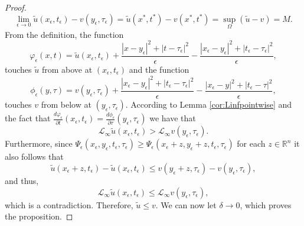 \documentclass[11pt]{article}
\providecommand{\Linf}{\mathcal{L}_{\infty}}
\providecommand{\Rn}{\mathbb{R}^n}
\numberwithin{equation}{section}
\theoremstyle{definition}
\begin{document}
\begin{proof}
    \begin{equation*}
        \lim_{\epsilon \to 0} \tilde{u}(x_{\epsilon}, t_{\epsilon})-v(y_{\epsilon}, \tau_{\epsilon}) =\tilde{u}(x^*,t^*)-v(x^*,t^*)= \sup_{\Omega}(\tilde{u}-v) = M.
    \end{equation*}
From the definition, the function
\begin{equation*}\label{eq:tildeutouch}
    \varphi_{\epsilon}(x,t)= \tilde{u}(x_{\epsilon},t_{\epsilon})+\frac{|x-y_{\epsilon}|^2+|t-\tau_{\epsilon}|^2}{\epsilon} - \frac{|x_{\epsilon}-y_{\epsilon}|^2+|t_{\epsilon}-\tau_{\epsilon}|^2}{\epsilon},
\end{equation*}
touches $\tilde{u}$ from above at $(x_{\epsilon}, t_{\epsilon})$ and the function 
\begin{equation*}\label{eq:vtouch}
    \phi_{\epsilon}(y,\tau)= v(y_{\epsilon},\tau_{\epsilon})+\frac{|x_{\epsilon}-y_{\epsilon}|^2+|t_{\epsilon}-\tau_{\epsilon}|^2}{\epsilon} - \frac{|x_{\epsilon}-y|^2+|t_{\epsilon}-\tau|^2}{\epsilon},
\end{equation*}
 touches $v$ from below at $(y_{\epsilon}, \tau_{\epsilon})$.
 According to Lemma \ref{cor:Linfpointwise} and the fact that $\frac{d\varphi_{\epsilon}}{\partial t}(x_{\epsilon}, t_{\epsilon})= \frac{d\phi_{\epsilon}}{\partial \tau}(y_{\epsilon}, \tau_{\epsilon})$ we have that
\begin{equation*}
    \Linf \tilde{u}(x_{\epsilon},t_{\epsilon}) > \Linf v(y_{\epsilon},\tau_{\epsilon}).
\end{equation*}
 Furthermore, since $\Psi_{\epsilon}(x_{\epsilon}, y_{\epsilon}, t_{\epsilon}, \tau_{\epsilon}) \geq \Psi_{\epsilon}(x_{\epsilon}+z, y_{\epsilon}+z, t_{\epsilon}, \tau_{\epsilon})$ for each $z \in \Rn$ it also follows that
\begin{equation}\label{eq:Linfcomp}
    \tilde{u}(x_{\epsilon}+z,t_{\epsilon})-\tilde{u}(x_{ \epsilon},t_{\epsilon}) \leq v(y_{\epsilon}+z, \tau_{\epsilon})-v(y_{\epsilon},\tau_{\epsilon}),
\end{equation}
and thus,
\begin{equation*}
       \Linf \tilde{u}(x_{\epsilon},t_{\epsilon}) \leq \Linf v(y_{\epsilon},\tau_{\epsilon}),
\end{equation*}
which is a contradiction. Therefore, $\tilde{u}  \leq v$. We can now let $\delta \to 0$, which proves the proposition.
\end{proof}

\end{document}

